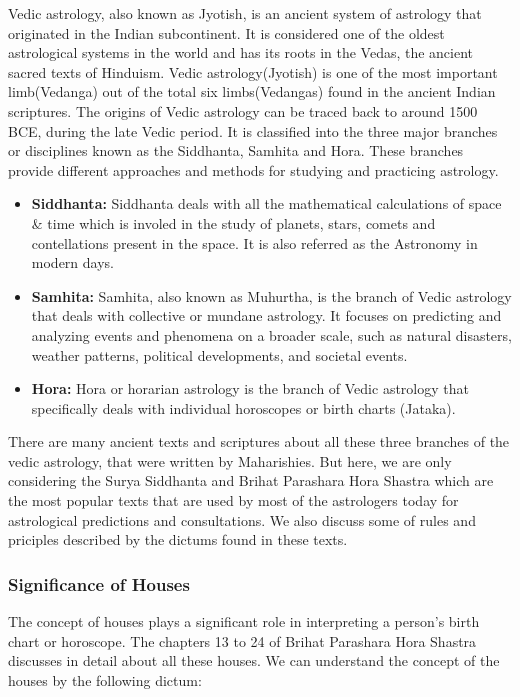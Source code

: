 Vedic astrology, also known as Jyotish, is an ancient system of astrology that originated in the Indian subcontinent. It is considered one of the oldest astrological systems in the world and has its roots in the Vedas, the ancient sacred texts of Hinduism.
Vedic astrology(Jyotish) is one of the most important limb(Vedanga) out of the total six limbs(Vedangas) found in the ancient Indian scriptures. The origins of Vedic astrology can be traced back to around 1500 BCE, during the late Vedic period. It is classified into the three major branches or disciplines known as the Siddhanta, Samhita and Hora. These branches provide different approaches and methods for studying and practicing astrology.

\begin{itemize}
	\item \textbf{Siddhanta:} Siddhanta deals with all the mathematical calculations of space \& time which is involed in the study of planets, stars, comets and contellations present in the space. It is also referred as the Astronomy in modern days.
	\item \textbf{Samhita:} Samhita, also known as Muhurtha, is the branch of Vedic astrology that deals with collective or mundane astrology. It focuses on predicting and analyzing events and phenomena on a broader scale, such as natural disasters, weather patterns, political developments, and societal events.
	\item \textbf{Hora:} Hora or horarian astrology is the branch of Vedic astrology that specifically deals with individual horoscopes or birth charts (Jataka).
\end{itemize}

There are many ancient texts and scriptures about all these three branches of the vedic astrology, that were written by Maharishies. But here, we are only considering the Surya Siddhanta\cite{SuryaSiddhanta, wiki:ss} and Brihat Parashara Hora Shastra\cite{BrihatParasharHoraShastraVol1, BrihatParasharHoraShastraVol2, wiki:bphs} which are the most popular texts that are used by most of the astrologers today for astrological predictions and consultations. We also discuss some of rules and priciples described by the dictums found in these texts.

\subsubsection{Significance of Houses}
The concept of houses plays a significant role in interpreting a person's birth chart or horoscope. The chapters 13 to 24 of Brihat Parashara Hora Shastra\cite{BrihatParasharHoraShastraVol1, BrihatParasharHoraShastraVol2, wiki:bphs} discusses in detail about all these houses. We can understand the concept of the houses by the following dictum:

